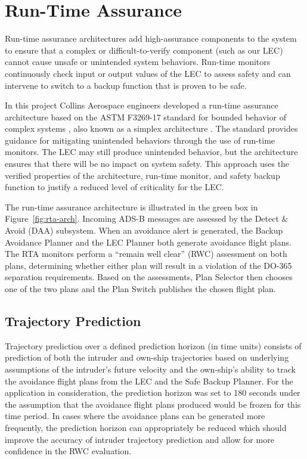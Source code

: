 \section{Run-Time Assurance}
\label{sec:rta}

Run-time assurance architectures add high-assurance components
to the system to ensure that a complex or difficult-to-verify component (such as our LEC) cannot cause
unsafe or unintended system behaviors. Run-time monitors
continuously check input or output values of the LEC to assess safety and can intervene to
switch to a backup function that is proven to be safe. 

In this project Collins Aerospace engineers developed a
run-time assurance architecture based on the ASTM F3269-17
standard for bounded behavior of complex systems \cite{F3269-17}, also
known as a simplex architecture \cite{simplex}. The standard provides
guidance for mitigating unintended behaviors through the
use of run-time monitors. The LEC may still produce unintended
behavior, but the architecture ensures that there will
be no impact on system safety. This approach  uses
the verified properties of the architecture, run-time monitor,
and safety backup function to justify a reduced level of
criticality for the LEC.

The run-time assurance architecture is illustrated in the green box in Figure~\ref{fig:rta-arch}.  Incoming ADS-B messages are assessed by the Detect \& Avoid (DAA) subsystem.  When an avoidance alert is generated, the Backup Avoidance Planner and the LEC Planner both generate avoidance flight plans.  The RTA monitors perform a ``remain well clear'' (RWC) assessment on both plans, determining whether either plan will result in a violation of the DO-365 separation requirements.  Based on the assessments, Plan Selector then chooses one of the two plans and the Plan Switch publishes the chosen flight plan.

\subsection{Trajectory Prediction} 
Trajectory prediction over a defined prediction horizon (in time units) consists of prediction of both the intruder and own-ship trajectories based on underlying assumptions of the intruder's future velocity and the own-ship's ability to track the avoidance flight plans from the LEC and the Safe Backup Planner. For the application in consideration, the prediction horizon was set to 180 seconds under the assumption that the avoidance flight plans produced would be frozen for this time period. In cases where the avoidance plans can be generated more frequently, the prediction horizon can appropriately be reduced which should improve the accuracy of intruder trajectory prediction and allow for more confidence in the RWC evaluation.

